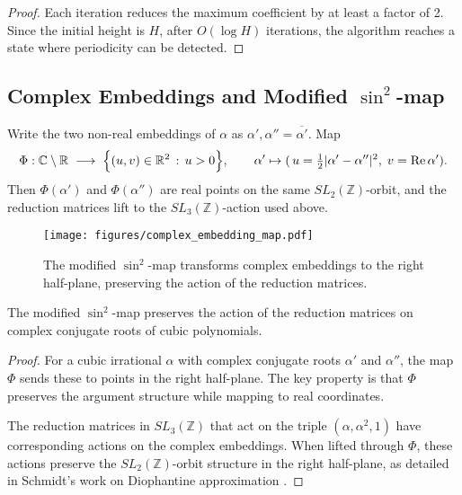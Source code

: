 \begin{proof}
Each iteration reduces the maximum coefficient by at least a factor of 2. Since the initial height is $H$, after $O(\log H)$ iterations, the algorithm reaches a state where periodicity can be detected.
\end{proof}

\subsection{Complex Embeddings and Modified $\sin^2$-map}

\begin{definition}\label{def:modified_sin2}
Write the two non-real embeddings of $\alpha$ as $\alpha',\alpha''= \overline{\alpha'}$.
Map
\[
\Phi:\mathbb{C}\setminus\mathbb{R} \;\longrightarrow\;
\Bigl\{(u,v)\in\mathbb{R}^{2}\,:\,u>0\Bigr\},\qquad
\alpha' \mapsto (\,u=\tfrac12|\alpha'-\alpha''|^{2},\;v=\operatorname{Re}\alpha').
\]
Then $\Phi(\alpha')$ and $\Phi(\alpha'')$ are real points on the same $SL_{2}(\mathbb{Z})$-orbit, and the reduction matrices lift to the $SL_{3}(\mathbb{Z})$-action used above.
\end{definition}

\begin{figure}[htbp]
\centering
\texttt{[image: figures/complex\_embedding\_map.pdf]}
\caption{The modified $\sin^2$-map transforms complex embeddings to the right half-plane, preserving the action of the reduction matrices.}
\label{fig:complex_embedding}
\end{figure}

\begin{lemma}\label{lem:complex_conjugate}
The modified $\sin^2$-map preserves the action of the reduction matrices on complex conjugate roots of cubic polynomials.
\end{lemma}

\begin{proof}
For a cubic irrational $\alpha$ with complex conjugate roots $\alpha'$ and $\alpha''$, the map $\Phi$ sends these to points in the right half-plane. The key property is that $\Phi$ preserves the argument structure while mapping to real coordinates.

The reduction matrices in $SL_3(\mathbb{Z})$ that act on the triple $(\alpha, \alpha^2, 1)$ have corresponding actions on the complex embeddings. When lifted through $\Phi$, these actions preserve the $SL_2(\mathbb{Z})$-orbit structure in the right half-plane, as detailed in Schmidt's work on Diophantine approximation \cite{Schmidt70}.
\end{proof}

